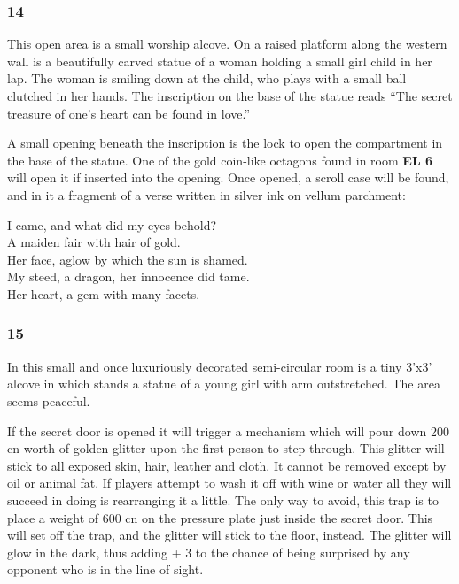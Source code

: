 \documentclass[palace_of_the_silver_princess]{subfiles}
\begin{document}
\subsubsection{14}
\begin{quotebox}
    This open area is a small worship alcove. On a raised platform
    along the western wall is a beautifully carved statue of a woman
    holding a small girl child in her lap. The woman is smiling down at
    the child, who plays with a small ball clutched in her hands. The
    inscription on the base of the statue reads “The secret treasure of
    one’s heart can be found in love.”
\end{quotebox}

A small opening beneath the inscription is the lock to open the
compartment in the base of the statue. One of the gold coin-like
octagons found in room \textbf{EL 6} will open it if inserted into the
opening.  Once opened, a scroll case will be found, and in it a fragment
of a verse written in silver ink on vellum parchment:

\begin{commentbox}{}
    I came, and what did my eyes behold? \\
    A maiden fair with hair of gold. \\
    Her face, aglow by which the sun is shamed. \\
    My steed, a dragon, her innocence did tame. \\
    Her heart, a gem with many facets.
\end{commentbox}

\subsubsection{15}
\begin{quotebox}
    In this small and once luxuriously decorated semi-circular room is a
    tiny 3’x3’ alcove in which stands a statue of a young girl with arm
    outstretched. The area seems peaceful.
\end{quotebox}

If the secret door is opened it will trigger a mechanism which will pour
down 200 cn worth of golden glitter upon the first person to step
through. This glitter will stick to all exposed skin, hair, leather and
cloth. It cannot be removed except by oil or animal fat. If players
attempt to wash it off with wine or water all they will succeed in doing
is rearranging it a little. The only way to avoid, this trap is to place
a weight of 600 cn on the pressure plate just inside the secret door.
This will set off the trap, and the glitter will stick to the floor,
instead. The glitter will glow in the dark, thus adding + 3 to the
chance of being surprised by any opponent who is in the line of sight.
    
\end{document}

